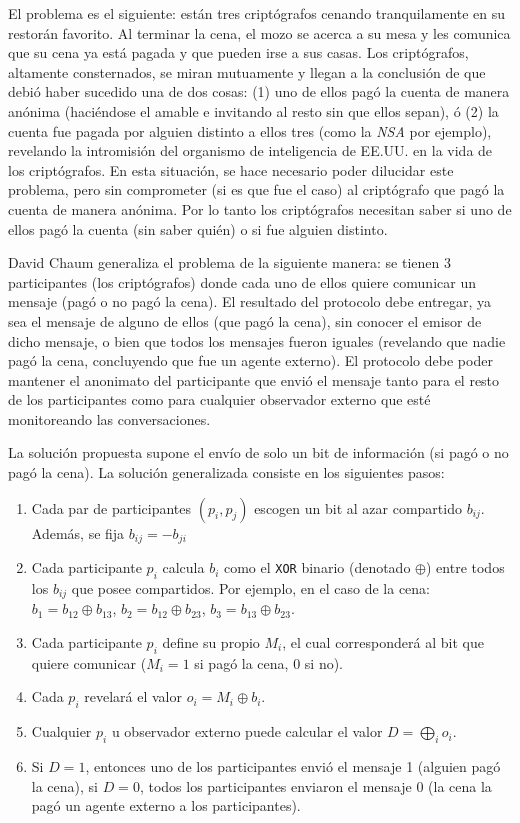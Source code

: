 El problema es el siguiente: están tres criptógrafos cenando tranquilamente en 
su restorán favorito. Al terminar la cena, el mozo se acerca a su mesa y les 
comunica que su cena ya está pagada y que pueden irse a sus casas. Los 
criptógrafos, altamente consternados, se miran mutuamente y llegan a la 
conclusión de que debió haber sucedido una de dos cosas: (1) uno de ellos pagó 
la cuenta de manera anónima (haciéndose el amable e invitando al resto sin que 
ellos sepan), ó (2) la cuenta fue pagada por alguien distinto a ellos tres 
(como la \emph{NSA} por ejemplo), revelando la intromisión del organismo de 
inteligencia de EE.UU. en la vida de los criptógrafos. En esta situación, se 
hace necesario poder dilucidar este problema, pero sin comprometer (si es que 
fue el caso) al criptógrafo que pagó la cuenta de manera anónima. Por lo tanto 
los criptógrafos necesitan saber si uno de ellos pagó la cuenta (sin saber 
quién) o si fue alguien distinto.

David Chaum generaliza el problema de la siguiente manera: se tienen 3 
participantes (los criptógrafos) donde cada uno de ellos quiere comunicar un 
mensaje (pagó o no pagó la cena). El resultado del protocolo debe entregar, ya 
sea el mensaje de alguno de ellos (que pagó la cena), sin conocer el emisor de 
dicho mensaje, o bien que todos los mensajes fueron iguales (revelando que 
nadie pagó la cena, concluyendo que fue un agente externo). El protocolo debe 
poder mantener el anonimato del participante que envió el mensaje tanto para 
el resto de los participantes como para cualquier observador externo que esté 
monitoreando las conversaciones.

La solución propuesta supone el envío de solo un bit de información (si pagó o 
no pagó la cena). La solución generalizada consiste en los siguientes pasos:
\begin{enumerate}
    \item Cada par de participantes $(p_i, p_j)$ escogen un bit al azar 
    compartido $b_{ij}$. Además, se fija $b_{ij} = -b_{ji}$
    \item Cada participante $p_i$ calcula $b_i$ como el \texttt{XOR} binario 
    (denotado $\oplus$) entre todos los $b_{ij}$ que posee compartidos. Por 
    ejemplo, en el caso de la cena: $b_1 = b_{12} \oplus b_{13}$, $b_2 = b_{12}
     \oplus b_{23}$, $b_3 = b_{13} \oplus b_{23}$.
    \item Cada participante $p_i$ define su propio $M_i$, el cual 
    corresponderá al bit que quiere comunicar ($M_i = 1$ si pagó la cena, $0$ 
    si no).
    \item Cada $p_i$ revelará el valor $o_i = M_i \oplus b_i$.
    \item Cualquier $p_i$ u observador externo puede calcular el valor 
    $D = \displaystyle\bigoplus_i o_i$.
    \item Si $D = 1$, entonces uno de los participantes envió el mensaje 1 
    (alguien pagó la cena), si $D = 0$, todos los participantes enviaron el 
    mensaje 0 (la cena la pagó un agente externo a los participantes).
\end{enumerate}

